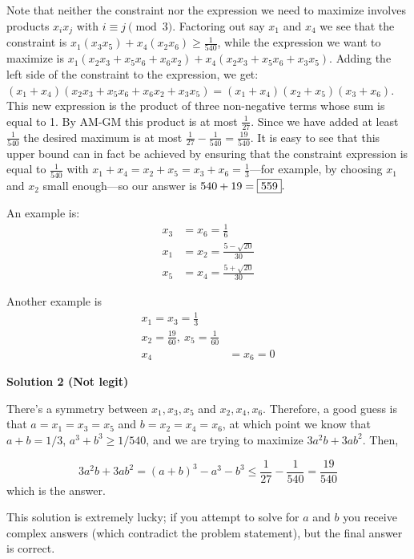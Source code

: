 \begin{enumerate}
Note that neither the constraint nor the expression we need to maximize involves products $x_i x_j$ with $i \equiv j \pmod 3$. Factoring out say $x_1$ and $x_4$ we see that the constraint is $x_1(x_3x_5) + x_4(x_2x_6) \ge {\frac1{540}}$, while the expression we want to maximize is $x_1(x_2x_3 + x_5x_6 + x_6x_2) + x_4(x_2x_3 + x_5x_6 + x_3x_5)$. Adding the left side of the constraint to the expression, we get: $(x_1 + x_4)(x_2x_3 + x_5x_6 + x_6x_2 + x_3x_5) = (x_1 + x_4)(x_2 + x_5)(x_3 + x_6)$. This new expression is the product of three non-negative terms whose sum is equal to 1. By AM-GM this product is at most $\frac1{27}$. Since we have added at least $\frac{1}{540}$ the desired maximum is at most $\frac1{27} - \frac1{540} =\frac{19}{540}$. It is easy to see that this upper bound can in fact be achieved by ensuring that the constraint expression is equal to $\frac1{540}$ with $x_1 + x_4 = x_2 + x_5 = x_3 + x_6 =\frac13$—for example, by choosing $x_1$ and $x_2$ small enough—so our answer is $540 + 19 = \fbox{559}.$

 An example is:
 \begin{align*} x_3 &= x_6 = \frac16 \\ x_1 &= x_2 = \frac{5 - \sqrt{20}}{30} \\ x_5 &= x_4 = \frac{5 + \sqrt{20}}{30} \end{align*}


 Another example is 
 \begin{align*} x_1 = x_3 = \frac{1}{3} \\ x_2 = \frac{19}{60}, \ x_5 = \frac{1}{60} \\ x_4 &= x_6 = 0 \end{align*}





\textbf{Solution 2 (Not legit)}

There's a symmetry between $x_1, x_3, x_5$ and $x_2,x_4,x_6$. Therefore, a good guess is that $a = x_1 = x_3 = x_5$ and $b = x_2 = x_4 = x_6$, at which point we know that $a+b = 1/3$, $a^3+b^3 \geq 1/540$, and we are trying to maximize $3a^2b+3ab^2$. Then,

 
 \[3a^2b+3ab^2 = (a+b)^3-a^3-b^3 \leq \frac{1}{27} - \frac{1}{540} = \boxed{\frac{19}{540}}\] which is the answer.

 This solution is extremely lucky; if you attempt to solve for $a$ and $b$ you receive complex answers (which contradict the problem statement), but the final answer is correct.

 



\end{enumerate}
